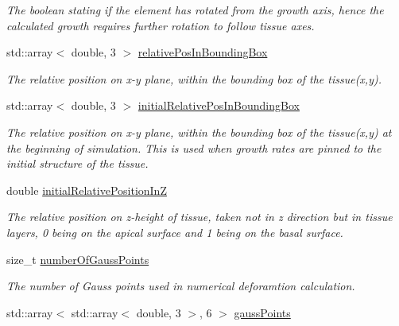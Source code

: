 \begin{DoxyCompactItemize}
\begin{DoxyCompactList}\small\item\em The boolean stating if the element has rotated from the growth axis, hence the calculated growth requires further rotation to follow tissue axes. \end{DoxyCompactList}\item 
\hypertarget{classShapeBase_af1e2ed2804c9d949810f2b9288c1d6ba}{}std\+::array$<$ double, 3 $>$ \hyperlink{classShapeBase_af1e2ed2804c9d949810f2b9288c1d6ba}{relative\+Pos\+In\+Bounding\+Box}\label{classShapeBase_af1e2ed2804c9d949810f2b9288c1d6ba}

\begin{DoxyCompactList}\small\item\em The relative position on x-\/y plane, within the bounding box of the tissue(x,y). \end{DoxyCompactList}\item 
\hypertarget{classShapeBase_a37eecd113e033c1b5cd64c5a6fefedc1}{}std\+::array$<$ double, 3 $>$ \hyperlink{classShapeBase_a37eecd113e033c1b5cd64c5a6fefedc1}{initial\+Relative\+Pos\+In\+Bounding\+Box}\label{classShapeBase_a37eecd113e033c1b5cd64c5a6fefedc1}

\begin{DoxyCompactList}\small\item\em The relative position on x-\/y plane, within the bounding box of the tissue(x,y) at the beginning of simulation. This is used when growth rates are pinned to the initial structure of the tissue. \end{DoxyCompactList}\item 
\hypertarget{classShapeBase_ab6847e4087010221acd07ad298c5c0bd}{}double \hyperlink{classShapeBase_ab6847e4087010221acd07ad298c5c0bd}{initial\+Relative\+Position\+In\+Z}\label{classShapeBase_ab6847e4087010221acd07ad298c5c0bd}

\begin{DoxyCompactList}\small\item\em The relative position on z-\/height of tissue, taken not in z direction but in tissue layers, 0 being on the apical surface and 1 being on the basal surface. \end{DoxyCompactList}\item 
\hypertarget{classShapeBase_a5c80fec4188317146cb31b74c36c7640}{}size\+\_\+t \hyperlink{classShapeBase_a5c80fec4188317146cb31b74c36c7640}{number\+Of\+Gauss\+Points}\label{classShapeBase_a5c80fec4188317146cb31b74c36c7640}

\begin{DoxyCompactList}\small\item\em The number of Gauss points used in numerical deforamtion calculation. \end{DoxyCompactList}\item 
\hypertarget{classShapeBase_ad9f6b579cace44139825e3105c101431}{}std\+::array$<$ std\+::array$<$ double, 3 $>$, 6 $>$ \hyperlink{classShapeBase_ad9f6b579cace44139825e3105c101431}{gauss\+Points}\label{classShapeBase_ad9f6b579cace44139825e3105c101431}


\end{DoxyCompactItemize}
